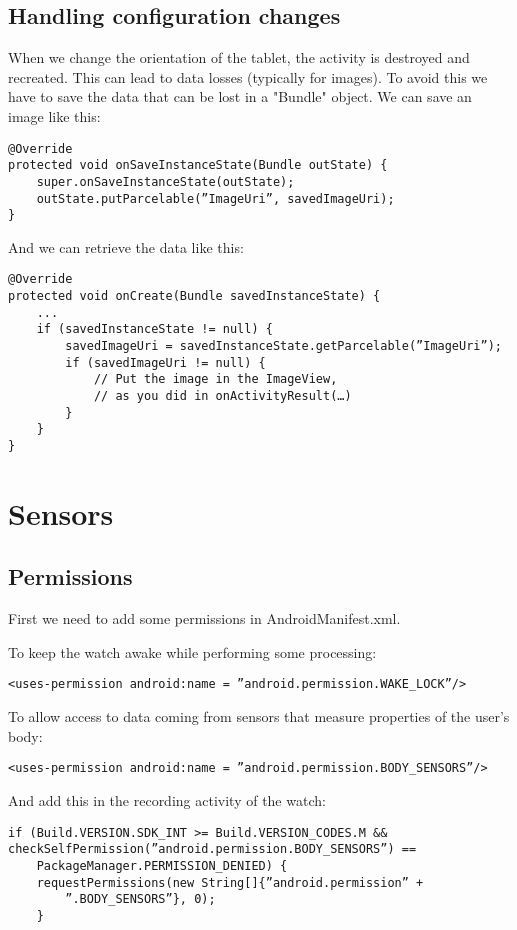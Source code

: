 \documentclass[11pt]{article}
\begin{document}
\subsection{Handling configuration changes}
When we change the orientation of the tablet, the activity is destroyed and recreated. This can lead to data losses (typically for images). To avoid this we have to save the data that can be lost in a "Bundle" object. We can save an image like this:
\begin{lstlisting}
@Override
protected void onSaveInstanceState(Bundle outState) {
    super.onSaveInstanceState(outState);
    outState.putParcelable(”ImageUri”, savedImageUri);
}
\end{lstlisting}
And we can retrieve the data like this:
\begin{lstlisting}
@Override
protected void onCreate(Bundle savedInstanceState) {
    ...
    if (savedInstanceState != null) {
        savedImageUri = savedInstanceState.getParcelable(”ImageUri”);
        if (savedImageUri != null) {
            // Put the image in the ImageView,
            // as you did in onActivityResult(…)
        }
    }
}
\end{lstlisting}

\section{Sensors}
\subsection{Permissions}
First we need to add some permissions in AndroidManifest.xml.

To keep the watch awake while performing some processing:
\begin{lstlisting}
<uses-permission android:name = ”android.permission.WAKE_LOCK”/>
\end{lstlisting}

To allow access to data coming from sensors that measure properties of the user's body:
\begin{lstlisting}
<uses-permission android:name = ”android.permission.BODY_SENSORS”/>
\end{lstlisting}
And add this in the recording activity of the watch:
\begin{lstlisting}
if (Build.VERSION.SDK_INT >= Build.VERSION_CODES.M &&
checkSelfPermission(”android.permission.BODY_SENSORS”) ==
    PackageManager.PERMISSION_DENIED) {
    requestPermissions(new String[]{”android.permission” +
        ”.BODY_SENSORS”}, 0);
    }
\end{lstlisting}
\end{document}
